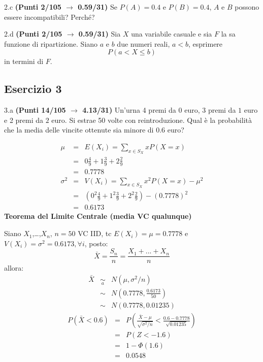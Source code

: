 \documentclass[
  11pt,
]{book}
\theoremstyle{mytheoremstyle}
\theoremstyle{mydefstyle}
\newenvironment{sol}
  {
  \begin{tcolorbox}[enhanced,breakable,arc=0.1mm,boxrule=1pt,colback=white,colframe=iblue,
  title=\bf \fontfamily{lmss}\selectfont \hspace{.5 cm} Soluzione,drop fuzzy shadow]

}{
\end{tcolorbox}
  }
\begin{document}
2.c \textbf{(Punti 2/105 \(\rightarrow\) 0.59/31)} Se \(P(A)=0.4\) e \(P(B)=0.4\), \(A\) e \(B\) possono essere incompatibili? Perché?

2.d \textbf{(Punti 2/105 \(\rightarrow\) 0.59/31)} Sia \(X\) una variabile casuale e sia \(F\) la sa funzione di ripartizione. Siano \(a\) e \(b\) due numeri reali, \(a<b\), esprimere
\[
P(a<X\leq b)
\]
in termini di \(F\).

\subsection{Esercizio 3}\label{esercizio-3-35}

3.a \textbf{(Punti 14/105 \(\rightarrow\) 4.13/31)} Un'urna 4 premi da \(\mbox{0}\) euro, 3 premi da \(\mbox{1}\) euro e 2 premi da \(\mbox{2}\) euro.
Si estrae 50 volte con reintroduzione.
Qual è la probabilità che la media delle vincite ottenute sia minore di 0.6 euro?

\begin{sol}
\begin{eqnarray*} \mu &=& E(X_i) = \sum_{x\in S_X}x P(X=x)\\ 
 &=&  0  \frac { 4 }{ 9 }+ 1  \frac { 3 }{ 9 }+ 2  \frac { 2 }{ 9 } \\ 
            &=& 0.7778 \\ 
 \sigma^2 &=& V(X_i) = \sum_{x\in S_X}x^2 P(X=x)-\mu^2\\ 
 &=&\left(  0  ^2\frac { 4 }{ 9 }+ 1  ^2\frac { 3 }{ 9 }+ 2  ^2\frac { 2 }{ 9 } \right)-( 0.7778 )^2\\ 
            &=& 0.6173 
\end{eqnarray*}
\textbf{Teorema del Limite Centrale (media VC qualunque)}

Siano \(X_1\),\ldots,\(X_n\), \(n=50\) VC IID, tc \(E(X_i)=\mu=0.7778\) e \(V(X_i)=\sigma^2=0.6173,\forall i\), posto:
\[
      \bar X=\frac{S_n}n =\frac{X_1 + ... + X_n}n
      \]
allora:\begin{eqnarray*}
  \bar X & \mathop{\sim}\limits_{a}& N(\mu,\sigma^2/n) \\
     &\sim & N\left(0.7778,\frac{0.6173}{50}\right) \\
     &\sim & N(0.7778,0.01235)
  \end{eqnarray*}\begin{eqnarray*}
      P( \bar X   <   0.6 ) 
        &=& P\left(  \frac { \bar X  -  \mu }{ \sqrt{\sigma^2/n} }  <  \frac { 0.6  -  0.7778 }{\sqrt{ 0.01235 }} \right)  \\
                 &=& P\left(  Z   <   -1.6 \right) \\    
                 &=&  1-\Phi( 1.6 ) \\ &=&  0.0548 
      \end{eqnarray*}

\end{sol}
\end{document}
